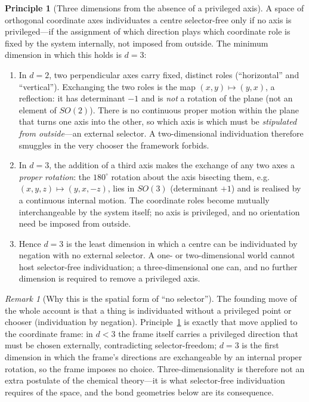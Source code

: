 \documentclass[11pt,a4paper]{article}
\theoremstyle{thmstyle}
\theoremstyle{definition}
\newtheorem{principle}[theorem]{Principle}
\theoremstyle{remark}
\newtheorem{remark}[theorem]{Remark}
\begin{document}
\begin{principle}[Three dimensions from the absence of a privileged axis]
\label{prin:threed}
A space of orthogonal coordinate axes individuates a centre
selector-free only if no axis is privileged---if the assignment of which
direction plays which coordinate role is fixed by the system internally,
not imposed from outside. The minimum dimension in which this holds is
$d=3$:
\begin{enumerate}[label=\textup{(\roman*)},leftmargin=2.2em]
\item In $d=2$, two perpendicular axes carry fixed, distinct roles
(``horizontal'' and ``vertical''). Exchanging the two roles is the map
$(x,y)\mapsto(y,x)$, a reflection: it has determinant $-1$ and is
\emph{not} a rotation of the plane (not an element of $SO(2)$). There is
no continuous proper motion within the plane that turns one axis into the
other, so which axis is which must be \emph{stipulated from outside}---an
external selector. A two-dimensional individuation therefore smuggles in
the very chooser the framework forbids.
\item In $d=3$, the addition of a third axis makes the exchange of any two
axes a \emph{proper rotation}: the $180^{\circ}$ rotation about the axis
bisecting them, e.g.\ $(x,y,z)\mapsto(y,x,-z)$, lies in $SO(3)$
(determinant $+1$) and is realised by a continuous internal motion. The
coordinate roles become mutually interchangeable by the system itself; no
axis is privileged, and no orientation need be imposed from outside.
\item Hence $d=3$ is the least dimension in which a centre can be
individuated by negation with no external selector. A one- or
two-dimensional world cannot host selector-free individuation; a
three-dimensional one can, and no further dimension is required to remove
a privileged axis.
\end{enumerate}
\end{principle}

\begin{remark}[Why this is the spatial form of ``no selector'']
\label{rem:threed}
The founding move of the whole account is that a thing is individuated
without a privileged point or chooser (individuation by negation).
Principle~\ref{prin:threed} is exactly that move applied to the
coordinate frame: in $d<3$ the frame itself carries a privileged
direction that must be chosen externally, contradicting selector-freedom;
$d=3$ is the first dimension in which the frame's directions are
exchangeable by an internal proper rotation, so the frame imposes no
choice. Three-dimensionality is therefore not an extra postulate of the
chemical theory---it is what selector-free individuation requires of the
space, and the bond geometries below are its consequence.
\end{remark}
\end{document}
